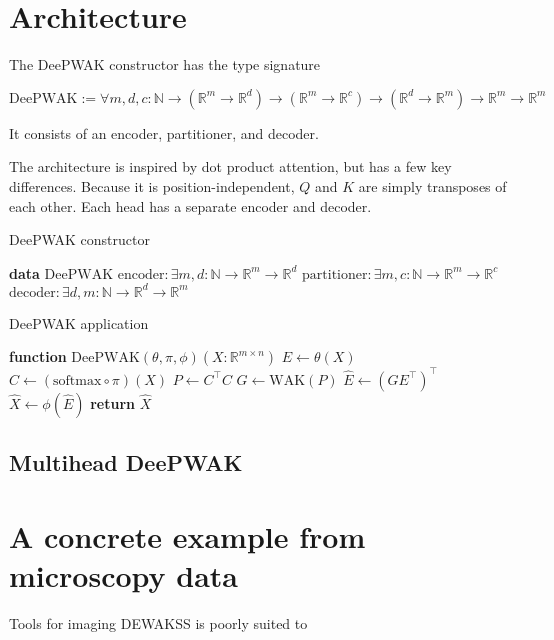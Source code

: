 \documentclass{article}
\begin{document}
\section{Architecture}

The DeePWAK constructor has the type signature

\begin{equation}
  \mathrm{DeePWAK} := \forall m,d,c :\mathbb{N} \to (\mathbb{R}^m \to \mathbb{R}^d) \to (\mathbb{R}^m \to \mathbb{R}^c) \to (\mathbb{R}^d \to \mathbb{R}^m) \to \mathbb{R}^m \to \mathbb{R}^m
\end{equation}

It consists of an encoder, partitioner, and decoder.

The architecture is inspired by dot product attention, but has a few key differences. Because it is position-independent, $Q$ and $K$ are simply transposes of each other. Each head has a separate encoder and decoder. 

\begin{algorithm}
  \caption{DeePWAK constructor}\label{alg:cap}
  \begin{algorithmic}[1]
    \State \textbf{data} $\mathrm{DeePWAK}${
    \State $\mathrm{encoder} : \exists m,d : \mathbb{N} \to \mathbb{R}^m \to \mathbb{R}^d$
    \State $\mathrm{partitioner} : \exists m,c : \mathbb{N} \to \mathbb{R}^m \to \mathbb{R}^c$
    \State $\mathrm{decoder} : \exists d,m : \mathbb{N} \to \mathbb{R}^d \to \mathbb{R}^m$
    }
  \end{algorithmic}
\end{algorithm}

\begin{algorithm}
  \caption{DeePWAK application}\label{alg:cap}
  \begin{algorithmic}[1]
    \State \textbf{function} $\mathrm{DeePWAK}(\theta, \pi, \phi)(X : \mathbb{R}^{m \times n})${
    \State $E \gets \theta(X)$
    \State $C \gets (\mathrm{softmax} \circ \pi)(X)$
    \State $P \gets C^\top C$
    \State $G \gets \mathrm{WAK}(P)$
    \State $\hat{E} \gets (GE^\top)^\top$
    \State $\hat{X} \gets \phi(\hat{E})$
    \State \textbf{return} $\hat{X}$
    }
  \end{algorithmic}
\end{algorithm}

\subsection{Multihead DeePWAK}

\section{A concrete example from microscopy data}
Tools for imaging 
DEWAKSS is poorly suited to 
\end{document}

